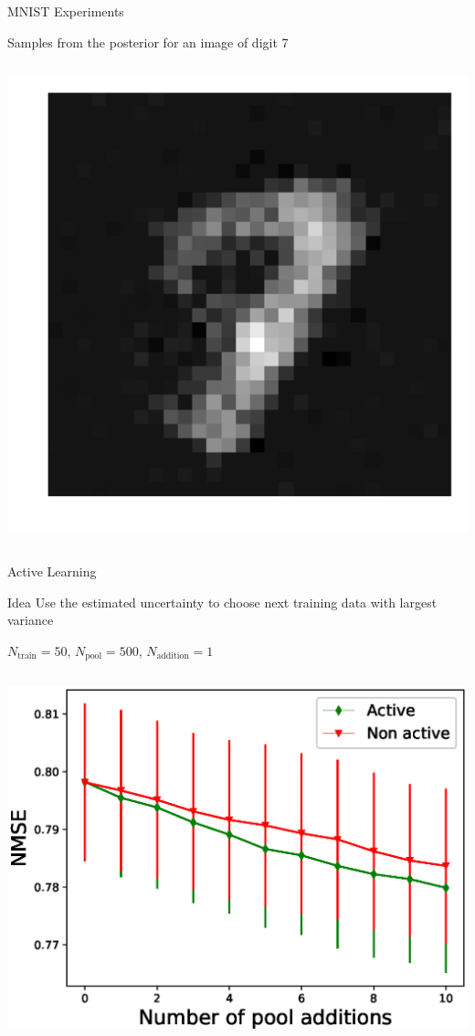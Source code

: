 \documentclass[9pt]{beamer}
\begin{document}
\begin{frame}{MNIST Experiments}
\begin{block}{Samples from the posterior for an image of digit 7}
\begin{columns}
\begin{column}{0.33\textwidth}
        \includegraphics[width=0.75\columnwidth]{graphics/posterior_sample_2}
      \end{column}
    \end{columns}
  \end{block}
\end{frame}

\begin{frame}{Active Learning}
  \centering
  \begin{block}{Idea}
    Use the estimated uncertainty to choose next training data with largest variance
  \end{block}
  $N_\text{train} = 50$, $N_\text{pool} = 500$, $N_\text{addition}=1$
  \begin{columns}
    \begin{column}{0.5\textwidth}
      \includegraphics[width=1.0\columnwidth]{graphics/active_mnist/nmse_validation}
    \end{column}
  \end{columns}

\end{frame}
\end{document}

